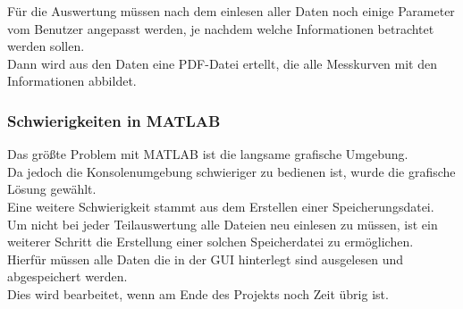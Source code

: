 Für die Auswertung müssen nach dem einlesen aller Daten noch einige Parameter vom Benutzer angepasst werden, je nachdem welche Informationen betrachtet werden sollen.\\
Dann wird aus den Daten eine PDF-Datei ertellt, die alle Messkurven mit den Informationen abbildet. \\

\subsubsection{Schwierigkeiten in MATLAB}

Das größte Problem mit MATLAB ist die langsame grafische Umgebung. \\
Da jedoch die Konsolenumgebung schwieriger zu bedienen ist, wurde die grafische Lösung gewählt.\\

Eine weitere Schwierigkeit stammt aus dem Erstellen einer Speicherungsdatei. Um nicht bei jeder Teilauswertung alle Dateien neu einlesen zu müssen, ist ein weiterer Schritt die Erstellung einer solchen Speicherdatei zu ermöglichen. \\
Hierfür müssen alle Daten die in der GUI hinterlegt sind ausgelesen und abgespeichert werden.\\
Dies wird bearbeitet, wenn am Ende des Projekts noch Zeit übrig ist. \\







